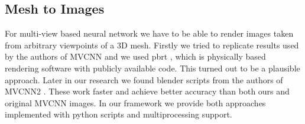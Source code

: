 \subsection{Mesh to Images}
For multi-view based neural network we have to be able to render images taken from arbitrary viewpoints of a 3D mesh. Firstly we tried to replicate results used by the authors of MVCNN \cite{su_multi-view_2015} and we used pbrt \cite{pharr_physically_2010}, which is physically based rendering software with publicly available code. This turned out to be a plausible approach. 
Later in our research we found blender scripts from the authors of MVCNN2 \cite{su_deeper_2018}. These work faster and achieve better accuracy than both ours and original MVCNN images. In our framework we provide both approaches implemented with python scripts and multiprocessing support. 

